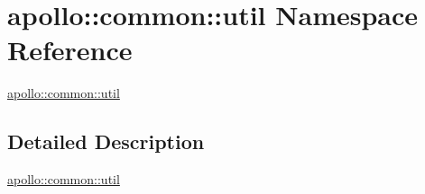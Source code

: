 \hypertarget{namespaceapollo_1_1common_1_1util}{\section{apollo\-:\-:common\-:\-:util Namespace Reference}
\label{namespaceapollo_1_1common_1_1util}
}


\hyperlink{namespaceapollo_1_1common_1_1util}{apollo\-::common\-::util}  




\subsection{Detailed Description}
\hyperlink{namespaceapollo_1_1common_1_1util}{apollo\-::common\-::util} 